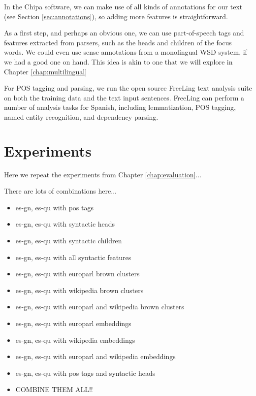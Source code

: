 In the Chipa software, we can make use of all kinds of annotations for our
text (see Section \ref{sec:annotations}), so adding more features is
straightforward.

As a first step, and perhaps an obvious one, we can use part-of-speech tags and
features extracted from parsers, such as the heads and children of the focus
words.
We could even use sense annotations from a monolingual WSD system, if we had a
good one on hand. This idea is akin to one that we will explore in Chapter
\ref{chap:multilingual}

For POS tagging and parsing, we run the open source FreeLing text analysis
suite \cite{padro12} on both the training data and the text input sentences.
FreeLing can perform a number of analysis tasks for Spanish, including
lemmatization, POS tagging, named entity recognition, and dependency parsing.

\section{Experiments}
Here we repeat the experiments from Chapter \ref{chap:evaluation}...

There are lots of combinations here...

\begin{itemize}
  \item es-gn, es-qu with pos tags
  \item es-gn, es-qu with syntactic heads
  \item es-gn, es-qu with syntactic children
  \item es-gn, es-qu with all syntactic features
\end{itemize}

\begin{itemize}
  \item es-gn, es-qu with europarl brown clusters
  \item es-gn, es-qu with wikipedia brown clusters
  \item es-gn, es-qu with europarl and wikipedia brown clusters
\end{itemize}

\begin{itemize}
  \item es-gn, es-qu with europarl embeddings
  \item es-gn, es-qu with wikipedia embeddings
  \item es-gn, es-qu with europarl and wikipedia embeddings
  \item es-gn, es-qu with pos tags and syntactic heads
\end{itemize}

\begin{itemize}
  \item COMBINE THEM ALL!!
\end{itemize}
